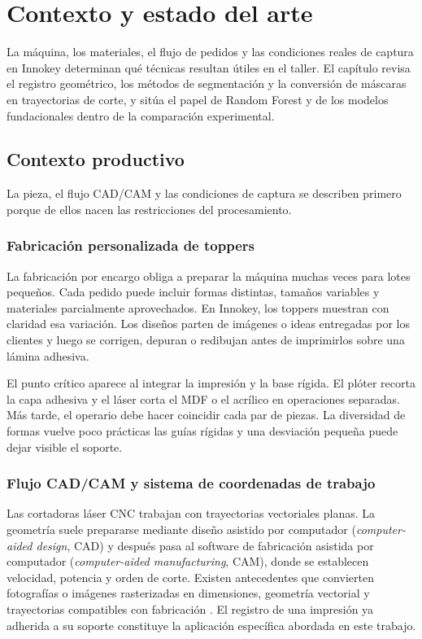 \chapter{Contexto y estado del arte}
\label{cap:contexto}

La máquina, los materiales, el flujo de pedidos y las condiciones reales de captura en Innokey determinan qué técnicas resultan útiles en el taller. El capítulo revisa el registro geométrico, los métodos de segmentación y la conversión de máscaras en trayectorias de corte, y sitúa el papel de Random Forest y de los modelos fundacionales dentro de la comparación experimental.

\section{Contexto productivo}

La pieza, el flujo CAD/CAM y las condiciones de captura se describen primero porque de ellos nacen las restricciones del procesamiento.

\subsection{Fabricación personalizada de toppers}

La fabricación por encargo obliga a preparar la máquina muchas veces para lotes pequeños. Cada pedido puede incluir formas distintas, tamaños variables y materiales parcialmente aprovechados. En Innokey, los toppers muestran con claridad esa variación. Los diseños parten de imágenes o ideas entregadas por los clientes y luego se corrigen, depuran o redibujan antes de imprimirlos sobre una lámina adhesiva.

El punto crítico aparece al integrar la impresión y la base rígida. El plóter recorta la capa adhesiva y el láser corta el MDF o el acrílico en operaciones separadas. Más tarde, el operario debe hacer coincidir cada par de piezas. La diversidad de formas vuelve poco prácticas las guías rígidas y una desviación pequeña puede dejar visible el soporte.

\subsection{Flujo CAD/CAM y sistema de coordenadas de trabajo}

Las cortadoras láser CNC trabajan con trayectorias vectoriales planas. La geometría suele prepararse mediante diseño asistido por computador (\textit{computer-aided design}, CAD) y después pasa al software de fabricación asistida por computador (\textit{computer-aided manufacturing}, CAM), donde se establecen velocidad, potencia y orden de corte. Existen antecedentes que convierten fotografías o imágenes rasterizadas en dimensiones, geometría vectorial y trayectorias compatibles con fabricación \cite{Bhandari2023,Jednorg2025,Khafagy2025}. El registro de una impresión ya adherida a su soporte constituye la aplicación específica abordada en este trabajo.

